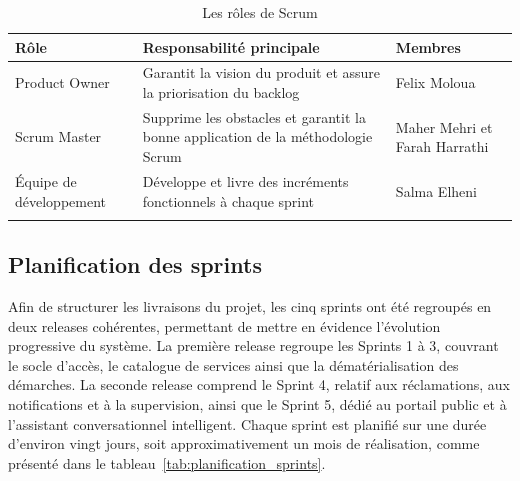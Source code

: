  \begin{longtable}{|p{3cm}|p{8cm}|p{3cm}|}
\hline
\rowcolor{gray!30}
\textbf{Rôle} & \textbf{Responsabilité principale} & \textbf{Membres} \\ \hline
\endfirsthead

 

Product Owner &
Garantit la vision du produit et assure la priorisation du backlog &
Felix Moloua \\ \hline

Scrum Master &
Supprime les obstacles et garantit la bonne application de la méthodologie Scrum &
Maher Mehri et Farah Harrathi \\ \hline

Équipe de développement &
Développe et livre des incréments fonctionnels à chaque sprint &
Salma Elheni \\ \hline

\rowcolor{white}
\caption{Les rôles de Scrum}
\label{tab:scrum_roles}
\end{longtable}

\subsection{Planification des sprints}

 

Afin de structurer les livraisons du projet, les cinq sprints ont été regroupés en deux releases cohérentes, permettant de mettre en évidence l’évolution progressive du système. La première release regroupe les Sprints 1 à 3, couvrant le socle d’accès, le catalogue de services ainsi que la dématérialisation des démarches. La seconde release comprend le Sprint 4, relatif aux réclamations, aux notifications et à la supervision, ainsi que le Sprint 5, dédié au portail public et à l’assistant conversationnel intelligent. Chaque sprint est planifié sur une durée d’environ vingt jours, soit approximativement un mois de réalisation, comme présenté dans le tableau~\ref{tab:planification_sprints}.




